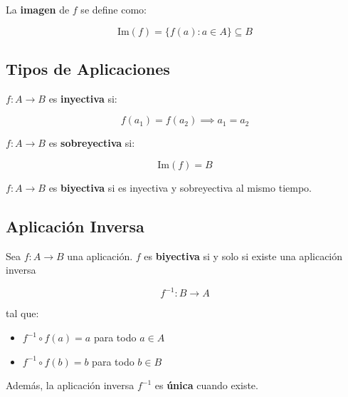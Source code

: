 \documentclass[a4paper,12pt]{article}
\begin{document}
\begin{procedimiento}[title=Imagen de una Aplicación]
La \textbf{imagen} de \(f\) se define como:

\[
\text{Im}(f) = \{ f(a) : a \in A \} \subseteq B
\]
\end{procedimiento}

\subsection{Tipos de Aplicaciones}

\begin{procedimiento}[title=Aplicación Inyectiva]
\(f : A \to B\) es \textbf{inyectiva} si:

\[
f(a_1) = f(a_2) \implies a_1 = a_2
\]
\end{procedimiento}

\begin{procedimiento}[title=Aplicación Sobreyectiva]
\(f : A \to B\) es \textbf{sobreyectiva} si:

\[
\text{Im}(f) = B
\]
\end{procedimiento}

\begin{procedimiento}[title=Aplicación Biyectiva]
\(f : A \to B\) es \textbf{biyectiva} si es inyectiva y sobreyectiva al mismo tiempo.
\end{procedimiento}

\subsection{Aplicación Inversa}

\begin{procedimiento}[title=Definición de Aplicación Inversa]
Sea \(f : A \to B\) una aplicación.  
\(f\) es \textbf{biyectiva} si y solo si existe una aplicación inversa

\[
f^{-1} : B \to A
\]

tal que:
\begin{itemize}
    \item \(f^{-1} \circ f(a) = a\) para todo \(a \in A\)
    \item \(f^{-1} \circ f(b) = b\) para todo \(b \in B\)
\end{itemize}

Además, la aplicación inversa \(f^{-1}\) es \textbf{única} cuando existe.
\end{procedimiento}
\end{document}
